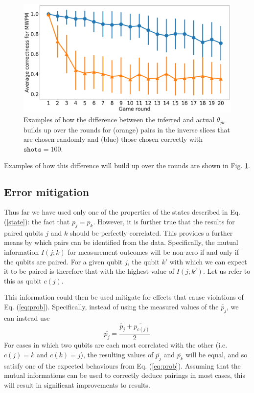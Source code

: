 \documentclass[aps,prl,twocolumn,showpacs,preprintnumbers]{revtex4-1}
\newcommand{\be}{\begin{equation}}
\newcommand{\ee}{\end{equation}}
\begin{document}
\begin{figure}[ht]
	\centering
    \includegraphics[width=\columnwidth]{figures/example_mwpm.png}
	\caption{Examples of how the difference between the inferred and actual  $\theta_{jk}$ builds up over the rounds for (orange) pairs in the inverse slices that are chosen randomly and (blue) those chosen correctly with $\mathtt{shots}=100$.}\label{fig:diff}
\end{figure}

Examples of how this difference will build up over the rounds are shown in Fig. \ref{fig:diff}.

\subsection{Error mitigation}

Thus far we have used only one of the properties of the states described in Eq. (\ref{state}): the fact that $p_j=p_k$. However, it is further true that the results for paired qubits $j$ and $k$ should be perfectly correlated. This provides a further means by which pairs can be identified from the data. Specifically, the mutual information $I(j;k)$ for measurement outcomes will be non-zero if and only if the qubits are paired. For a given qubit $j$, the qubit $k′$ with which we can expect it to be paired is therefore that with the highest value of $I(j;k′)$. Let us refer to this as qubit $c(j)$.

This information could then be used mitigate for effects that cause violations of Eq. (\ref{eq:prob}). Specifically, instead of using the measured values of the $\tilde{p_j}$, we can instead use
\be
\bar{p_j} = \frac{ \tilde{p_j} + \tilde{p_{c(j)}} }{2}
\ee
For cases in which two qubits are each most correlated with the other (i.e. $c(j)=k$ and $c(k)=j$), the resulting values of $\bar{p_j}$ and $\bar{p_k}$ will be equal, and so satisfy one of the expected behaviours from Eq. (\ref{eq:prob}). Assuming that the mutual informations can be used to correctly deduce pairings in most cases, this will result in significant improvements to results.
\end{document}
